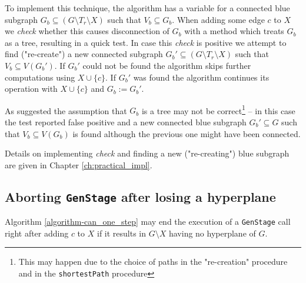 To implement this technique, the algorithm has a variable for a connected blue subgraph $G_b \subseteq (G \setminus T_r \setminus X)$ such that $V_b \subseteq G_b$. When adding some edge $c$ to $X$ we \textit{check} whether this causes disconnection of $G_b$ with a method which treats $G_b$ as a tree, resulting in a quick test. In case this \textit{check} is positive we attempt to find ("re-create") a new connected subgraph $G_b' \subseteq (G \setminus T_r \setminus X)$ such that $V_b \subseteq V(G_b')$. If $G_b'$ could not be found the algorithm skips further computations using $X \cup \{c\}$. If $G_b'$ was found the algorithm continues its operation with $X \cup \{c\}$ and $G_b := G_b'$.

As suggested the assumption that $G_b$ is a tree may not be correct\footnote{This may happen due to the choice of paths in the "re-creation" procedure and in the \lstinline|shortestPath| procedure} -- in this case the test reported false positive and a new connected blue subgraph $G_b' \subseteq G$ such that $V_b \subseteq V(G_b)$ is found although the previous one might have been connected.

Details on implementing \textit{check} and finding a new ("re-creating") blue subgraph are given in Chapter \ref{ch:practical_impl}.

\subsection*{Aborting \lstinline|GenStage| after losing a hyperplane}

\begin{claim}
	Algorithm \ref{algorithm-can_one_step} may end the execution of a \lstinline|GenStage| call right after adding $c$ to $X$ if it results in $G \setminus X$ having no hyperplane of $G$.
\end{claim}


\clearpage

